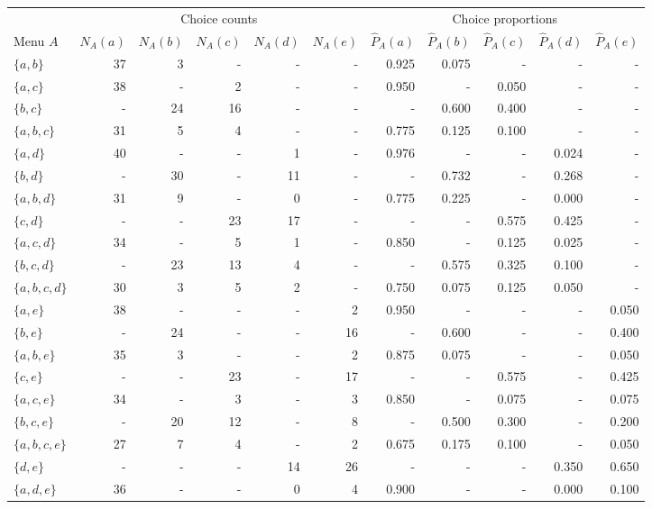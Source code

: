 \documentclass[
]{article}
\begin{document}
\begin{table}
\begin{tabular}{lrrrrrrrrrr}
\toprule
\multicolumn{1}{c}{ } & \multicolumn{5}{c}{Choice counts} & \multicolumn{5}{c}{Choice proportions} \\
\cmidrule(l{3pt}r{3pt}){2-6} \cmidrule(l{3pt}r{3pt}){7-11}
Menu $A$ & $N_A(a)$ & $N_A(b)$ & $N_A(c)$ & $N_A(d)$ & $N_A(e)$ & $\hat P_A(a)$ & $\hat P_A(b)$ & $\hat P_A(c)$ & $\hat P_A(d)$ & $\hat P_A(e)$\\
\midrule
$\{a,b\}$ & 37 & 3 & - & - & - & 0.925 & 0.075 & - & - & -\\
$\{a,c\}$ & 38 & - & 2 & - & - & 0.950 & - & 0.050 & - & -\\
$\{b,c\}$ & - & 24 & 16 & - & - & - & 0.600 & 0.400 & - & -\\
$\{a,b,c\}$ & 31 & 5 & 4 & - & - & 0.775 & 0.125 & 0.100 & - & -\\
$\{a,d\}$ & 40 & - & - & 1 & - & 0.976 & - & - & 0.024 & -\\
\addlinespace
$\{b,d\}$ & - & 30 & - & 11 & - & - & 0.732 & - & 0.268 & -\\
$\{a,b,d\}$ & 31 & 9 & - & 0 & - & 0.775 & 0.225 & - & 0.000 & -\\
$\{c,d\}$ & - & - & 23 & 17 & - & - & - & 0.575 & 0.425 & -\\
$\{a,c,d\}$ & 34 & - & 5 & 1 & - & 0.850 & - & 0.125 & 0.025 & -\\
$\{b,c,d\}$ & - & 23 & 13 & 4 & - & - & 0.575 & 0.325 & 0.100 & -\\
\addlinespace
$\{a,b,c,d\}$ & 30 & 3 & 5 & 2 & - & 0.750 & 0.075 & 0.125 & 0.050 & -\\
$\{a,e\}$ & 38 & - & - & - & 2 & 0.950 & - & - & - & 0.050\\
$\{b,e\}$ & - & 24 & - & - & 16 & - & 0.600 & - & - & 0.400\\
$\{a,b,e\}$ & 35 & 3 & - & - & 2 & 0.875 & 0.075 & - & - & 0.050\\
$\{c,e\}$ & - & - & 23 & - & 17 & - & - & 0.575 & - & 0.425\\
\addlinespace
$\{a,c,e\}$ & 34 & - & 3 & - & 3 & 0.850 & - & 0.075 & - & 0.075\\
$\{b,c,e\}$ & - & 20 & 12 & - & 8 & - & 0.500 & 0.300 & - & 0.200\\
$\{a,b,c,e\}$ & 27 & 7 & 4 & - & 2 & 0.675 & 0.175 & 0.100 & - & 0.050\\
$\{d,e\}$ & - & - & - & 14 & 26 & - & - & - & 0.350 & 0.650\\
$\{a,d,e\}$ & 36 & - & - & 0 & 4 & 0.900 & - & - & 0.000 & 0.100\\

\end{tabular}
\end{table}
\end{document}

